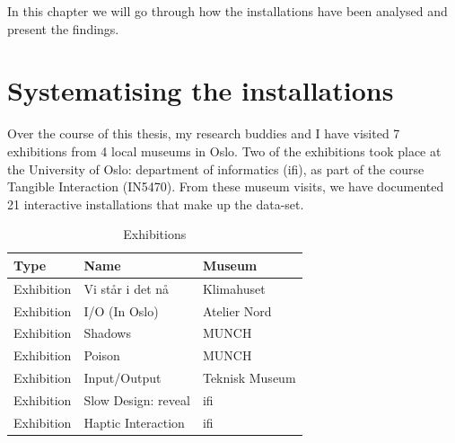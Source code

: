 In this chapter we will go through how the installations have been analysed and present the findings.

\section{Systematising the installations}
Over the course of this thesis, my research buddies and I have visited 7 exhibitions from 4 local museums in Oslo. Two of the exhibitions took place at the University of Oslo: department of informatics (ifi), as part of the course Tangible Interaction (IN5470). From these museum visits, we have documented 21 interactive installations that make up the data-set.

\begin{table}[H]
\centering
\begin{tabular}{l | l| l}
\textbf{Type} & \textbf{Name} & \textbf{Museum}\\
\hline
Exhibition & Vi står i det nå & Klimahuset \\
Exhibition & I/O (In Oslo) & Atelier Nord\\
Exhibition & Shadows & MUNCH\\
Exhibition & Poison & MUNCH \\
Exhibition & Input/Output & Teknisk Museum \\
Exhibition & Slow Design: reveal & ifi \\
Exhibition & Haptic Interaction & ifi \\
\end{tabular}
\caption{Exhibitions}
\label{tab:abc}
\end{table}

